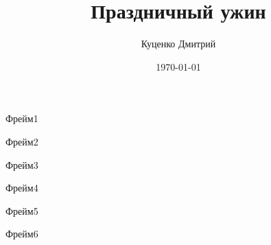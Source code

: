 \documentclass[t]{beamer}
\author{Куценко Дмитрий}
\title{Праздничный ужин}
\date{\today}
\begin{document}
\begin{frame}[plain]
    \titlepage
\end{frame}

\begin{frame}
    Фрейм1
\end{frame}

\begin{frame}
    Фрейм2
\end{frame}

\begin{frame}
    Фрейм3
\end{frame}

\begin{frame}
    Фрейм4
\end{frame}

\begin{frame}
    Фрейм5
\end{frame}

\begin{frame}
    Фрейм6
\end{frame}
\end{document}
